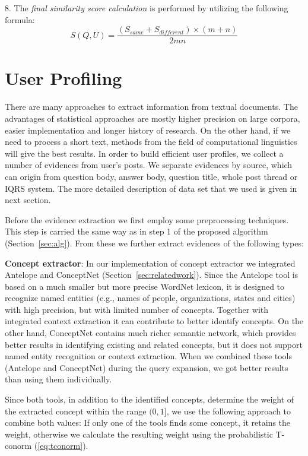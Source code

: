 \documentclass[conference]{IEEEtran}
\newcommand{\secref}[1]{Section~\ref{#1}}
\begin{document}
8. The {\it final similarity score calculation} is performed by utilizing the following formula:
\begin{equation}
	\label{eq:s}
	S(Q,U) = \frac{(S_{same}+S_{different})\times (m+n)}{2mn}
\end{equation}
	
\section{User Profiling}
\label{sec:userprofiling}
There are many approaches to extract information from textual documents. The advantages of statistical approaches are mostly higher precision on large corpora, easier implementation and longer history of research. On the other hand, if we need to process a short text, methods from the field of computational linguistics will give the best results. In order to build efficient user profiles, we collect a number of evidences from user's posts. We separate evidences by source, which can origin from question body, answer body, question title, whole post thread or IQRS system. The more detailed description of data set that we used is given in next section.  

Before the evidence extraction we first employ some preprocessing techniques. This step is carried the same way as in step 1 of the proposed algorithm (\secref{sec:alg}). From these we further extract evidences of the following types:

{\bf Concept extractor}:
In our implementation of concept extractor we integrated Antelope and ConceptNet (\secref{sec:relatedwork}). Since the Antelope tool is based on a much smaller but more precise WordNet lexicon, it is designed to recognize named entities (e.g., names of people, organizations, states and cities) with high precision, but with limited number of concepts. Together with integrated context extraction it can contribute to better identify concepts. On the other hand, ConceptNet contains much richer semantic network, which provides better results in identifying existing and related concepts, but it does not support named entity recognition or context extraction. When we combined these tools (Antelope and ConceptNet) during the query expansion, we got better results than using them individually.

Since both tools, in addition to the identified concepts, determine the weight of the extracted concept within the range $(0,1]$, we use the following approach to combine both values: If only one of the tools finds some concept, it retains the weight, otherwise we calculate the resulting weight using the probabilistic T-conorm (\ref{eq:tconorm}). 
\end{document}
